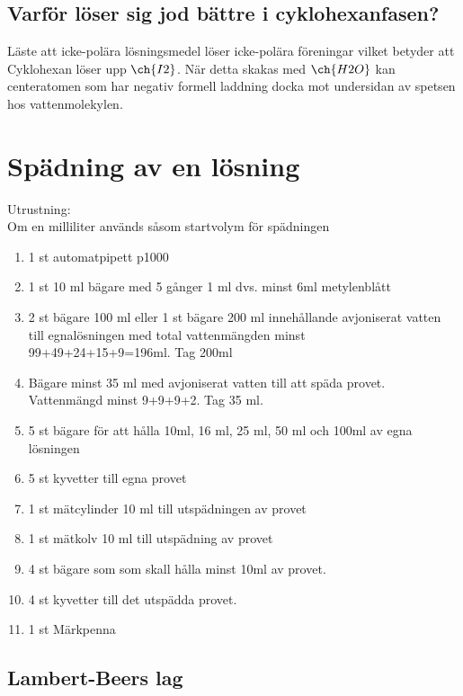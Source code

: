 \documentclass[./chem_exercises.tex]{subfiles}
\begin{document}
\subsection{Varför löser sig jod bättre i cyklohexanfasen?}

Läste att icke-polära lösningsmedel löser icke-polära föreningar vilket betyder att
Cyklohexan löser upp $\ch{I2}$. När detta skakas med $\ch{H2O}$ kan centeratomen som har negativ
formell laddning docka mot undersidan av spetsen hos vattenmolekylen.




\section{Spädning av en lösning}
Utrustning:\\
Om en milliliter används såsom startvolym för spädningen
\begin{enumerate}
\item 1 st automatpipett p1000\\
\item 1 st 10 ml bägare med 5 gånger 1 ml dvs. minst 6ml metylenblått\\
\item 2 st bägare 100 ml eller 1 st bägare 200 ml innehållande avjoniserat vatten
till egnalösningen med total vattenmängden minst\\
99+49+24+15+9=196ml. Tag 200ml

\item Bägare minst 35 ml med avjoniserat vatten till att späda provet.\\
Vattenmängd minst 9+9+9+2. Tag 35 ml.
\item 5 st bägare för att hålla 10ml, 16 ml, 25 ml, 50 ml och 100ml av egna lösningen
\item 5 st kyvetter till egna provet
\item 1 st mätcylinder 10 ml till utspädningen av provet
\item 1 st mätkolv 10 ml till utspädning av provet
\item 4 st bägare som som skall hålla minst 10ml av provet.
\item 4 st kyvetter till det utspädda provet.
\item 1 st Märkpenna
\end{enumerate}



\subsection{Lambert-Beers lag}
\end{document}
